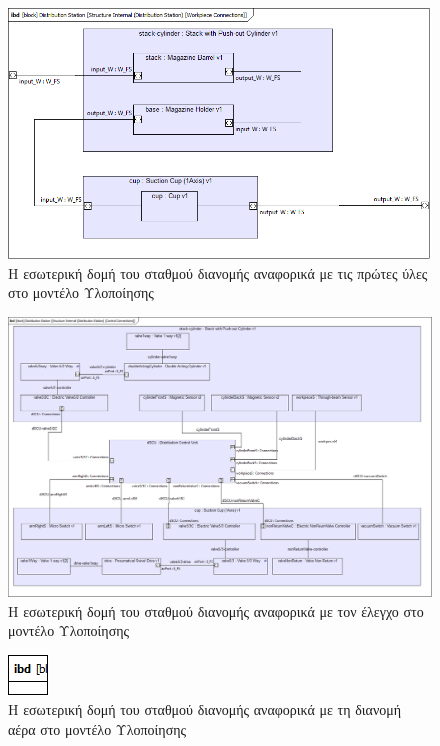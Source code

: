 \documentclass[a4paper,12pt,twoside]{report}
\begin{document}
{\begin{appendices}
				\begin{figure}[hp]
					\centering
					\includegraphics[scale=0.50]{DesignModel_StructureInternal(DistributionStation)[WorkpieceConnections].png}
					\caption{Η εσωτερική δομή του σταθμού διανομής αναφορικά με τις πρώτες ύλες στο μοντέλο Υλοποίησης}
					\label{φωτ:Η εσωτερική δομή του σταθμού διανομής αναφορικά με τις πρώτες ύλες στο μοντέλο Υλοποίησης}
				\end{figure}
				
				\begin{figure}[hp]
					\centering
					\includegraphics[scale=0.30]{DesignModel_StructureInternal(DistributionStation)[ControlConnections].png}
					\caption{Η εσωτερική δομή του σταθμού διανομής αναφορικά με τον έλεγχο στο μοντέλο Υλοποίησης}
					\label{φωτ:Η εσωτερική δομή του σταθμού διανομής αναφορικά με τον έλεγχο στο μοντέλο Υλοποίησης}
				\end{figure}
				
				\begin{figure}[hp]
					\centering
					\includegraphics[scale=0.50]{DesignModel_StructureInternal(DistributionStation)[AirConnections].png}
					\caption{Η εσωτερική δομή του σταθμού διανομής αναφορικά με τη διανομή αέρα στο μοντέλο Υλοποίησης}
					\label{φωτ:Η εσωτερική δομή του σταθμού διανομής αναφορικά με τη διανομή αέρα στο μοντέλο Υλοποίησης}
				\end{figure}
				

\end{appendices}}
\end{document}
